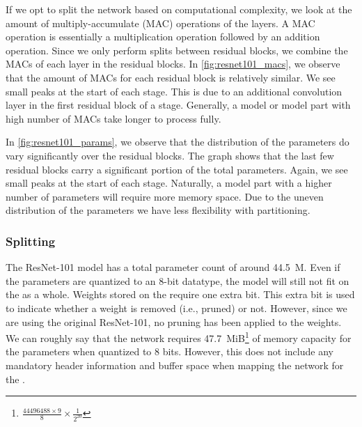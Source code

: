 If we opt to split the network based on computational complexity, we look at the amount of multiply-accumulate (MAC) operations of the layers.
A MAC operation is essentially a multiplication operation followed by an addition operation.
Since we only perform splits between residual blocks, we combine the MACs of each layer in the residual blocks.
In \cref{fig:resnet101_macs}, we observe that the amount of MACs for each residual block is relatively similar.
We see small peaks at the start of each stage.
This is due to an additional convolution layer in the first residual block of a stage.
Generally, a model or model part with high number of MACs take longer to process fully.

In \cref{fig:resnet101_params}, we observe that the distribution of the parameters do vary significantly over the residual blocks.
The graph shows that the last few residual blocks carry a significant portion of the total parameters.
Again, we see small peaks at the start of each stage.
Naturally, a model part with a higher number of parameters will require more memory space.
Due to the uneven distribution of the parameters we have less flexibility with partitioning. 

\subsubsection{Splitting}
The ResNet-101 model has a total parameter count of around \SI{44.5}{M}.
Even if the parameters are quantized to an 8-bit datatype, the model will still not fit on the \graicore{} as a whole.
Weights stored on the \graicore{} require one extra bit.
This extra bit is used to indicate whether a weight is removed (i.e., pruned) or not.
However, since we are using the original ResNet-101, no pruning has been applied to the weights.
We can roughly say that the network requires \SI{47.7}{MiB}\footnote{$\frac{\num{44496488} \times 9}{8} \times \frac{1}{2^{20}}$} of memory capacity for the parameters when quantized to 8 bits.
However, this does not include any mandatory header information and buffer space when mapping the network for the \graicore{}. 

